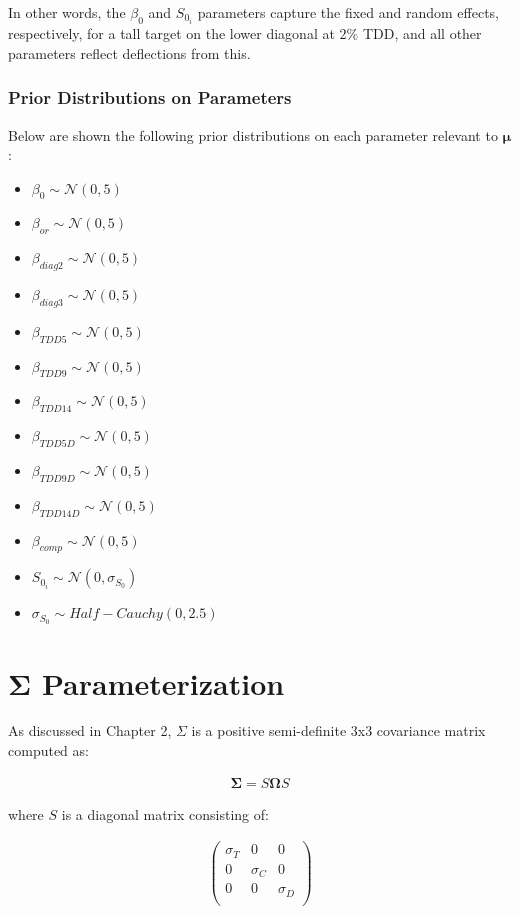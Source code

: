 {In other words, the $\beta_{0}$ and $S_{0}_{i}$ parameters capture the fixed and random effects, respectively, for a tall target on the lower diagonal at $2\%$ TDD, and all other parameters reflect deflections from this.

\subsubsection{Prior Distributions on Parameters}
Below are shown the following prior distributions on each parameter relevant to $\boldsymbol{\mu}$:
\begin{itemize}
    \item $\beta_{0} \sim \mathcal{N}(0,5)$
    \item $\beta_{or} \sim \mathcal{N}(0,5)$
    \item $\beta_{diag2} \sim \mathcal{N}(0,5)$
    \item $\beta_{diag3} \sim \mathcal{N}(0,5)$
    \item $\beta_{TDD5} \sim \mathcal{N}(0,5)$
    \item $\beta_{TDD9} \sim \mathcal{N}(0,5)$
    \item $\beta_{TDD14} \sim \mathcal{N}(0,5)$
    \item $\beta_{TDD5D} \sim \mathcal{N}(0,5)$
    \item $\beta_{TDD9D} \sim \mathcal{N}(0,5)$
    \item $\beta_{TDD14D} \sim \mathcal{N}(0,5)$
    \item $\beta_{comp} \sim \mathcal{N}(0,5)$
    \item $S_{0}_{i} \sim \mathcal{N}(0,\sigma_{S}_{0})$
    \item $\sigma_{S}_{0} \sim Half-Cauchy(0,2.5)$
\end{itemize}

\section{$\boldsymbol{\Sigma}$ Parameterization}
As discussed in Chapter 2, $\Sigma$ is a positive semi-definite 3x3 covariance matrix computed as:

\begin{align}
   \boldsymbol{\Sigma}=S\boldsymbol{\Omega}S
   \label{eqn:Sigma}
\end{align}

where $S$ is a diagonal matrix consisting of: 

\begin{align}
   \begin{pmatrix}
      \sigma_{T} & 0 & 0 \\
      0 & \sigma_{C} & 0 \\
      0 & 0 & \sigma_{D} \\
   \end{pmatrix}
   \label{eqn:S}
\end{align}

}
